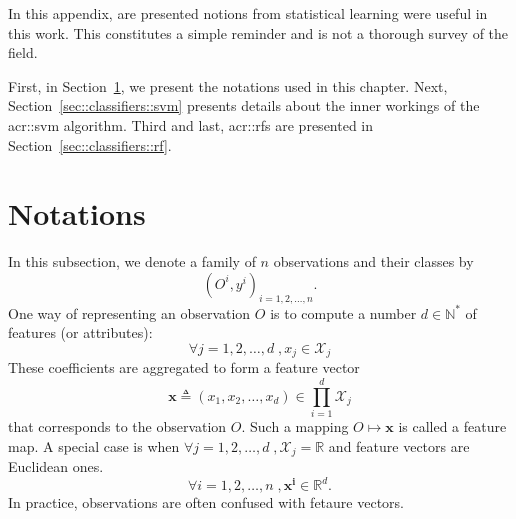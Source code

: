 \minitoc

\vfill

In this appendix, are presented notions from statistical learning were useful in this work.
This constitutes a simple reminder and is not a thorough survey of the field.

First, in Section~\ref{sec::classifiers::notations}, we present the notations used in this chapter.
Next, Section~\ref{sec::classifiers::svm} presents details about the inner workings of the \gls{acr::svm} algorithm.
Third and last, \glspl{acr::rf} are presented in Section~\ref{sec::classifiers::rf}.

\clearpage

\section{Notations}
    \label{sec::classifiers::notations}
    In this subsection, we denote a family of \(n\) observations and their classes by
    \begin{equation*}
        \left(O^i, y^i\right)_{i = 1, 2, \dots, n}.
    \end{equation*}
    One way of representing an observation \(O\) is to compute a number \(d \in \mathbb{N}^*\) of features (or attributes):
    \begin{equation*}
        \forall j = 1, 2, \dots, d \;, x_j \in \mathscr{X}_j
    \end{equation*}
    These coefficients are aggregated to form a feature vector 
    \begin{equation*}
        \bm{x} \triangleq \left(x_1, x_2, \dots, x_d\right) \in \prod_{i=1}^{d} \mathscr{X}_j
    \end{equation*}
    that corresponds to the observation \(O\).
    Such a mapping \(O \mapsto \bm{x}\) is called a feature map.
    A special case is when \(\forall j=1, 2, \dots, d\;, \mathscr{X}_j = \mathbb{R}\) and feature vectors are Euclidean ones.
    \begin{equation*}
        \forall i = 1, 2, \dots, n \;, \bm{x^i} \in \mathbb{R}^d.
    \end{equation*}
    In practice, observations are often confused with fetaure vectors.

